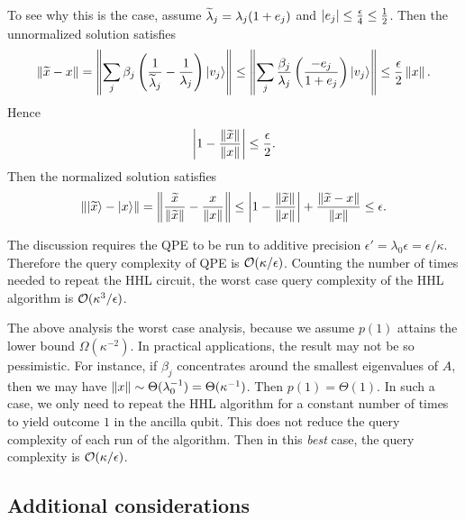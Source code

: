 To see why this is the case, assume $\widetilde{\lambda}_j=\lambda_j(1+e_j)$ and $\left\lvert e_j\right\rvert\le \frac{\epsilon}{4}\le \frac{1}{2}$. 
Then the unnormalized solution satisfies
\begin{equation}
\left\lVert\widetilde{x}-x\right\rVert=\left\lVert\sum_{j} \beta_j\left(\frac{1}{\widetilde{\lambda}_j}-\frac{1}{\lambda_j}\right)\ket{v_j}\right\rVert\le \left\lVert\sum_{j} \frac{\beta_j}{\lambda_j}\left(\frac{-e_j}{1+e_j}\right)\ket{v_j}\right\rVert
\le \frac{\epsilon}{2} \left\lVert x\right\rVert.
\end{equation}
Hence
\begin{equation}
\left\lvert1-\frac{\left\lVert\widetilde{x}\right\rVert}{\left\lVert x\right\rVert}\right\rvert\le \frac{\epsilon}{2}.
\end{equation}
Then the normalized solution satisfies
\begin{equation}
\left\lVert\ket{\widetilde{x}}-\ket{x}\right\rVert=\left\lVert\frac{\widetilde{x}}{\left\lVert\widetilde{x}\right\rVert}-\frac{x}{\left\lVert x\right\rVert}\right\rVert\le \left\lvert1-\frac{\left\lVert\widetilde{x}\right\rVert}{\left\lVert x\right\rVert}\right\rvert+\frac{\left\lVert\widetilde{x}-x\right\rVert}{\left\lVert x\right\rVert}\le \epsilon.
\end{equation}

The discussion requires the QPE to be run to additive precision $\epsilon'=\lambda_0 \epsilon=\epsilon/\kappa$. 
Therefore the query complexity of QPE is $\mathcal{O}(\kappa/\epsilon)$. 
Counting the number of times needed to repeat the HHL circuit, the worst case query complexity of the HHL algorithm is $\mathcal{O}(\kappa^3/\epsilon)$.

The above analysis the worst case analysis, because we assume $p(1)$ attains the lower bound $\Omega(\kappa^{-2})$.
In practical applications, the result may not be so pessimistic.
For instance, if $\beta_j$ concentrates around the smallest eigenvalues of $A$, then we may have $\left\lVert x\right\rVert\sim \Theta(\lambda_0^{-1})=\Theta(\kappa^{-1})$. Then $p(1)=\Theta(1)$.
In such a case, we only need to repeat the HHL algorithm for a constant number of times to yield outcome $1$ in the ancilla qubit.
This does not reduce the query complexity of each run of the algorithm. 
Then in this \emph{best} case, the query complexity is $\mathcal{O}(\kappa/\epsilon)$.

\subsection{Additional considerations}

